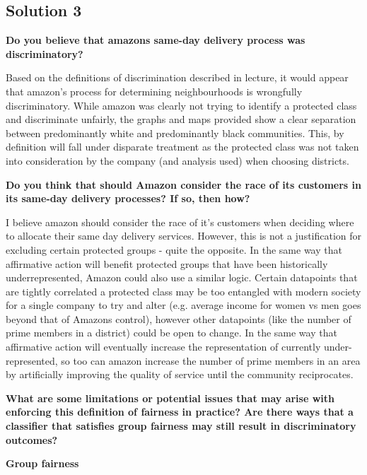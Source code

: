 \documentclass[submit]{harvardml}
\begin{document}
\subsection*{Solution 3}

\item \textbf{Do you believe that amazons same-day delivery process was discriminatory?}

Based on the definitions of discrimination described in lecture, it would appear that amazon's process for determining neighbourhoods is wrongfully discriminatory. While amazon was clearly not trying to identify a protected class and discriminate unfairly, the graphs and maps provided show a clear separation between predominantly white and predominantly black communities. This, by definition will fall under disparate treatment as the protected class was not taken into consideration by the company (and analysis used) when choosing districts.

\item \textbf{ Do you think that should Amazon consider the race of its customers in its same-day delivery processes?  If so, then how?}

I believe amazon should consider the race of it's customers when deciding where to allocate their same day delivery services. However, this is not a justification for excluding certain protected groups - quite the opposite. In the same way that affirmative action will benefit protected groups that have been historically underrepresented, Amazon could also use a similar logic. Certain datapoints that are tightly correlated a protected class may be too entangled with modern society for a single company to try and alter (e.g. average income for women vs men goes beyond that of Amazons control), however other datapoints (like the number of prime members in a district) could be open to change. In the same way that affirmative action will eventually increase the representation of currently under-represented, so too can amazon increase the number of prime members in an area by artificially improving the quality of service until the community reciprocates.

\item \textbf{What  are  some  limitations  or  potential  issues  that  may  arise  with  enforcing  this  definition  of fairness in practice?  Are there ways that a classifier that satisfies group fairness may still result in discriminatory outcomes?}

\textbf{Group fairness}
\end{document}
